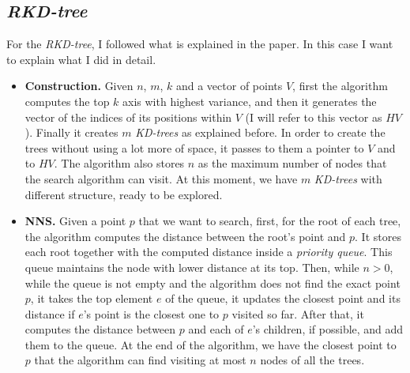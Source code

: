 \subsection{\textit{RKD-tree}}
For the \textit{RKD-tree}, I followed what is explained in the paper. In this case I want to explain what I did in detail.
\begin{itemize}
    \item \textbf{Construction.} Given $n$, $m$, $k$ and a vector of points $V$, first the algorithm computes the top $k$ axis with highest variance, and then it generates the vector of the indices of its positions within $V$ (I will refer to this vector as $HV$). Finally it creates $m$ \textit{KD-trees} as explained before. In order to create the trees without using a lot more of space, it passes to them a pointer to $V$ and to $HV$. The algorithm also stores $n$ as the maximum number of nodes that the search algorithm can visit. At this moment, we have $m$ \textit{KD-trees} with different structure, ready to be explored.
    \item \textbf{NNS.} Given a point $p$ that we want to search, first, for the root of each tree, the algorithm computes the distance between the root's point and $p$. It stores each root together with the computed distance inside a \textit{priority queue}. This queue maintains the node with lower distance at its top. Then, while $n > 0$, while the queue is not empty and the algorithm does not find the exact point $p$, it takes the top element $e$ of the queue, it updates the closest point and its distance if $e$'s point is the closest one to $p$ visited so far. After that, it computes the distance between $p$ and each of $e$'s children, if possible, and add them to the queue. At the end of the algorithm, we have the closest point to $p$ that the algorithm can find visiting at most $n$ nodes of all the trees.
\end{itemize}